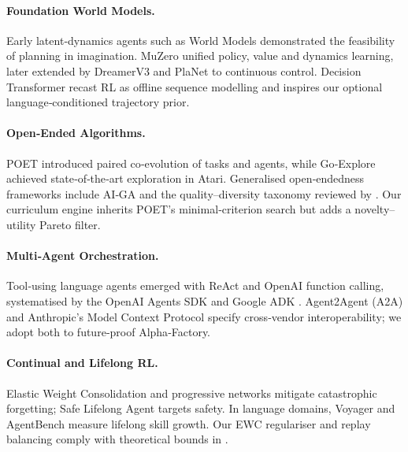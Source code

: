 \paragraph{Foundation World Models.}
Early latent‐dynamics agents such as World Models \cite{ha2018world}
demonstrated the feasibility of planning in imagination.
MuZero \cite{schrittwieser2019muzero} unified policy, value and dynamics
learning, later extended by DreamerV3 \cite{hafner2023dreamer} and PlaNet
\cite{hafner2019planet} to continuous control.  Decision Transformer
\cite{chen2021decision} recast RL as offline sequence modelling and inspires
our optional language‐conditioned trajectory prior.

\paragraph{Open‐Ended Algorithms.}
POET \cite{wang2019poet} introduced paired co‑evolution of tasks and agents,
while Go‑Explore \cite{ecoffet2020goexplore} achieved state‐of‑the‑art
exploration in Atari.  Generalised open‐endedness frameworks include AI‑GA
\cite{clune2019aiga} and the quality–diversity taxonomy reviewed by
\textcite{pugh2016quality}.  Our curriculum engine inherits POET's
minimal‑criterion search but adds a novelty–utility Pareto filter.

\paragraph{Multi‑Agent Orchestration.}
Tool‑using language agents emerged with ReAct and OpenAI function calling,
systematised by the OpenAI Agents SDK \cite{openaiagents2024} and Google ADK
\cite{googleadk2024}.  Agent2Agent (A2A) \cite{a2a2023} and Anthropic’s Model
Context Protocol \cite{anthropicmcp2023} specify cross‑vendor
interoperability; we adopt both to future‑proof Alpha‑Factory.

\paragraph{Continual and Lifelong RL.}
Elastic Weight Consolidation \cite{kirkpatrick2017ewc} and
progressive networks mitigate catastrophic forgetting; Safe Lifelong Agent
\cite{vanseijen2019sla} targets safety.  In language domains, Voyager
\cite{wang2023voyager} and AgentBench \cite{huang2023agentbench} measure
lifelong skill growth.  Our EWC regulariser and replay balancing comply with
theoretical bounds in \cite{jiang2015dependence}.


